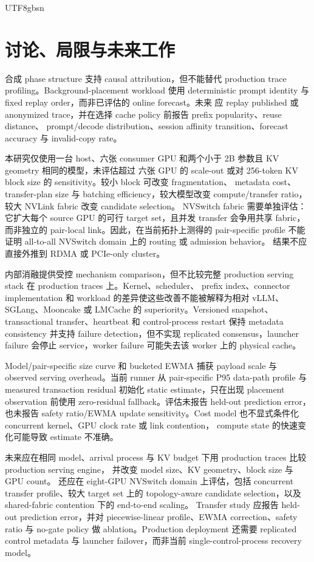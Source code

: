 \documentclass[11pt,a4paper]{article}
\begin{document}
\begin{CJK*}{UTF8}{gbsn}
\section{讨论、局限与未来工作}

合成 phase structure 支持 causal attribution，但不能替代 production trace profiling。Background-placement
workload 使用 deterministic prompt identity 与 fixed replay order，而非已评估的 online forecast。未来
应 replay published 或 anonymized trace，并在选择 cache policy 前报告 prefix popularity、reuse distance、
prompt/decode distribution、session affinity transition、forecast accuracy 与 invalid-copy rate。

本研究仅使用一台 host、六张 consumer GPU 和两个小于 2B 参数且 KV geometry 相同的模型，未评估超过
六张 GPU 的 scale-out 或对 256-token KV block size 的 sensitivity。较小 block 可改变 fragmentation、
metadata cost、transfer-plan size 与 batching efficiency，较大模型改变 compute/transfer ratio，较大
NVLink fabric 改变 candidate selection。
NVSwitch fabric 需要单独评估：它扩大每个 source GPU 的可行 target set，且并发 transfer 会争用共享 fabric，
而非独立的 pair-local link。因此，在当前拓扑上测得的 pair-specific profile 不能证明 all-to-all NVSwitch domain
上的 routing 或 admission behavior。
结果不应直接外推到 RDMA 或 PCIe-only cluster。

内部消融提供受控 mechanism comparison，但不比较完整 production serving stack 在 production traces 上。Kernel、scheduler、
prefix index、connector implementation 和 workload 的差异使这些改善不能被解释为相对 vLLM、SGLang、Mooncake 或
LMCache 的 superiority。Versioned snapshot、transactional transfer、heartbeat 和 control-process restart
保持 metadata consistency 并支持 failure detection，但不实现 replicated consensus，launcher failure 会停止
service，worker failure 可能失去该 worker 上的 physical cache。

Model/pair-specific size curve 和 bucketed EWMA 捕获 payload scale 与 observed serving overhead。当前 runner
从 pair-specific P95 data-path profile 与 measured transaction residual 初始化 static estimate，只在出现
placement observation 前使用 zero-residual fallback。评估未报告 held-out prediction error，也未报告 safety
ratio/EWMA update sensitivity。Cost model 也不显式条件化 concurrent kernel、GPU clock rate 或 link contention，
compute state 的快速变化可能导致 estimate 不准确。

未来应在相同 model、arrival process 与 KV budget 下用 production traces 比较 production serving engine，
并改变 model size、KV geometry、block size 与 GPU count。
还应在 eight-GPU NVSwitch domain 上评估，包括 concurrent transfer profile、较大 target set 上的 topology-aware
candidate selection，以及 shared-fabric contention 下的 end-to-end scaling。
Transfer study 应报告 held-out prediction error，并对 piecewise-linear profile、EWMA correction、safety ratio 与
no-gate policy 做 ablation。Production deployment 还需要 replicated control metadata 与 launcher failover，而非当前
single-control-process recovery model。


\end{CJK*}
\end{document}
